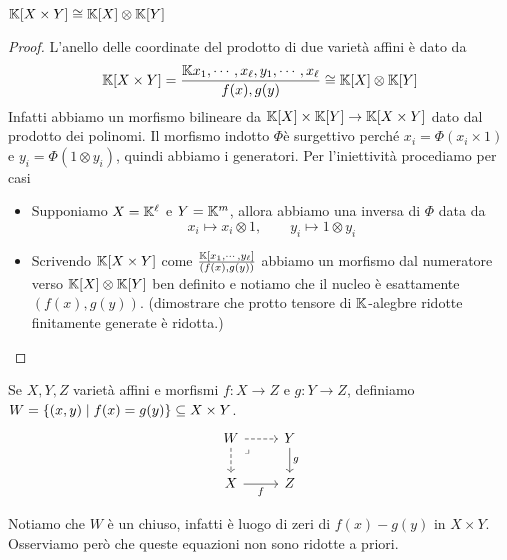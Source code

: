 \begin{proposition}
$\mathbb{K}[X\times Y]\cong \mathbb{K}[X]\otimes\mathbb{K}[Y]$
\end{proposition}
\begin{proof}
L'anello delle coordinate del prodotto di due variet\`a affini \`e dato da
\[\mathbb{K}[X\times Y]=\frac{\mathbb{K}{x_1,\cdots, x_\ell,y_1,\cdots, x_\ell}}{f(x),g(y)}\cong \mathbb{K}[X]\otimes \mathbb{K}[Y]\]
Infatti abbiamo un morfismo bilineare da $\mathbb{K}[X]\times\mathbb{K}[Y]\to \mathbb{K}[X\times Y]$ dato dal prodotto dei polinomi. Il morfismo indotto $\Phi $\`e surgettivo perch\'e $x_i=\Phi(x_i\times 1)$ e $y_i=\Phi(1\otimes y_i)$, quindi abbiamo i generatori. Per l'iniettivit\`a procediamo per casi
\begin{itemize}
	\item Supponiamo $X=\mathbb{K}^\ell$ e $Y=\mathbb{K}^m$, allora abbiamo una inversa di $\Phi$ data da
	\[x_i\mapsto x_i\otimes 1,\qquad y_i\mapsto 1\otimes y_i\]
	\item Scrivendo $\mathbb{K}[X\times Y]$ come $\frac{\mathbb{K}[x_1,\cdots, y_\ell]}{(f(x),g(y))}$ abbiamo un morfismo dal numeratore verso $\mathbb{K}[X]\otimes \mathbb{K}[Y]$ ben definito e notiamo che il nucleo \`e esattamente $(f(x),g(y))$. (dimostrare che protto tensore di $\mathbb{K}$-alegbre ridotte finitamente generate \`e ridotta.)
\end{itemize}
\end{proof}

\begin{definition}
Se $X,Y,Z$ variet\`a affini e morfismi $f:X\to Z$ e $g:Y\to Z$, definiamo $W=\left\{{(x,y)\mid f(x)=g(y)}\right\}\subseteq X\times Y$. 
\[\begin{tikzcd}
	W & Y \\
	X & Z
	\arrow[dashed, from=1-1, to=1-2]
	\arrow[dashed, from=1-1, to=2-1]
	\arrow["\lrcorner"{anchor=center, pos=0.125}, draw=none, from=1-1, to=2-2]
	\arrow["g", from=1-2, to=2-2]
	\arrow["f"', from=2-1, to=2-2]
\end{tikzcd}\]
\end{definition}

\begin{remark}
Notiamo che $W$ \`e un chiuso, infatti \`e luogo di zeri di $f(x)-g(y)$ in $X\times Y$. Osserviamo per\`o che queste equazioni non sono ridotte a priori.
\end{remark}


